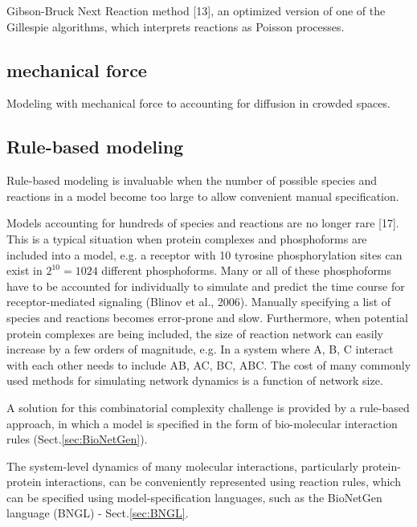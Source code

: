 Gibson-Bruck Next Reaction method [13], an optimized version of one of the
Gillespie algorithms, which interprets reactions as Poisson processes.


 
\subsection{mechanical force}

Modeling with mechanical force to accounting for diffusion in crowded spaces.


\subsection{Rule-based modeling}
\label{sec:Rule-based-modeling}

Rule-based modeling is invaluable when the number of possible species and
reactions in a model become too large to allow convenient manual specification.

Models accounting for hundreds of species and reactions are no longer rare [17].
This is a typical situation when protein complexes and phosphoforms are included
into a model, e.g. a receptor with 10 tyrosine phosphorylation sites can exist
in $2^{10}=1024$ different phosphoforms.
Many or all of these phosphoforms have to be accounted for individually to
simulate and predict the time course for receptor-mediated signaling (Blinov et
al., 2006).  Manually specifying a list of species and reactions becomes
error-prone and slow.
Furthermore, when potential protein complexes are being included, the size of
reaction network can easily increase by a few orders of magnitude, e.g. In a
system where A, B, C interact with each other needs to include AB, AC, BC, ABC.
The cost of many commonly used methods for simulating network dynamics is a
function of network size.

A solution for this combinatorial complexity challenge is provided by a
rule-based approach, in which a model is specified in the form of bio-molecular
interaction rules (Sect.\ref{sec:BioNetGen}).


The system-level dynamics of many molecular interactions, particularly
protein-protein interactions, can be conveniently represented using reaction
rules, which can be specified using model-specification languages, such as the
BioNetGen language (BNGL) - Sect.\ref{sec:BNGL}.


